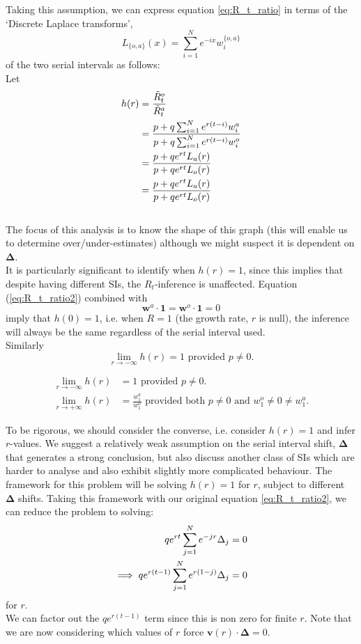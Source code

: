 \documentclass[10pt,journal,compsoc]{IEEEtran}
\begin{document}
Taking this assumption, we can express equation \ref{eq:R_t_ratio} in terms of the `Discrete Laplace transforms',  $$ L_{\{o, a\}}(x) = \sum_{i=1}^{N}e^{-ix}w_i^{\{o, a\}}$$ of the two serial intervals as follows:\\
Let
\begin{align}
h(r) &= \frac{\tilde{R}_t^o}{\tilde{R}_t^a} \notag\\
&= \frac{p + q\sum_{i=1}^N e^{r(t-i)}w_i^a}{p + q\sum_{i=1}^N e^{r(t-i)}w_i^o} \notag\\
&= \frac{p+qe^{rt}L_a(r)}{p+qe^{rt}L_o(r)} \notag\\ 
&= \frac{p+qe^{rt}L_a(r)}{p+qe^{rt}L_o(r)} \label{eq:R_t_ratio2}
\end{align}\\
The focus of this analysis is to know the shape of this graph (this will enable us to determine over/under-estimates) although we might suspect it is dependent on $\boldsymbol{\Delta}$.\\ It is particularly significant to identify when $h(r) = 1$, since this implies that despite having different SIs, the $R_t$-inference is unaffected. Equation (\ref{eq:R_t_ratio2}) combined with $$ \boldsymbol{w}^a \cdot \boldsymbol{1} = \boldsymbol{w}^o \cdot \boldsymbol{1}=0$$ imply that $h(0) = 1$, i.e. when $R=1$ (the growth rate, $r$ is null), the inference will always be the same regardless of the serial interval used.\\
Similarly 
$$\lim_{r \rightarrow -\infty}h(r)=1 \text{ provided }p \neq 0.$$

\begin{align*}
    \lim_{r \rightarrow -\infty}h(r)&=1 \text{ provided }p \neq 0.\\
    \lim_{r \rightarrow +\infty}h(r)&=\frac{w_1^a}{w_1^o} \text{ provided both }p \neq 0 \text{ and }w_1^o \neq 0 \neq w_1^a.
\end{align*}

To be rigorous, we should consider the converse, i.e. consider $h(r) = 1$ and infer $r$-values. We suggest a relatively weak assumption on the serial interval shift, $\boldsymbol{\Delta}$ that generates a strong conclusion, but also discuss another class of SIs which are harder to analyse and also exhibit slightly more complicated behaviour. The framework for this problem will be solving $h(r) = 1$ for $r$, subject to different $\boldsymbol{\Delta}$ shifts. Taking this framework with our original equation \ref{eq:R_t_ratio2}, we can reduce the problem to solving: 
\begin{align}
   qe^{rt}\sum_{j=1}^{N} e^{-jr}\Delta_j &= 0 \notag \\
   \implies qe^{r(t-1)}\sum_{j=1}^{N} e^{r(1-j)}\Delta_j &= 0 \label{eq:Key}
\end{align}
for $r$.\\
We can factor out the $qe^{r(t-1)}$ term since this is non zero for finite $r$. Note that we are now considering which values of $r$ force $\boldsymbol{v}(r) \cdot \boldsymbol{\Delta}=0$.
\end{document}
